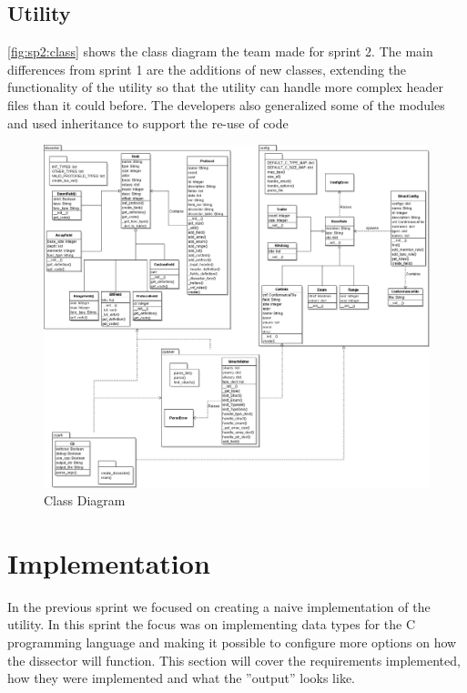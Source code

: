 \subsection{Utility}
\autoref{fig:sp2:class} shows the class diagram the team made for sprint 2. The main differences from sprint 1 are the additions of new classes, extending the functionality of the utility so that the utility can handle more complex header files than it could before. The developers also generalized some of the modules and used inheritance to support the re-use of code 
\begin{figure}[!htb]
	\center
	\includegraphics[width=\textwidth]{./sprints/img/class_diagram_s2}
	\caption{Class Diagram\label{fig:sp2:class}}
\end{figure}



\section{Implementation}

In the previous sprint we focused on creating a naive implementation of the 
utility. In this sprint the focus was on implementing data types for the 
C programming language and making it possible to configure more options on how 
the dissector will function. This section will cover the requirements 
implemented, how they were implemented and what the ''output'' looks like.

